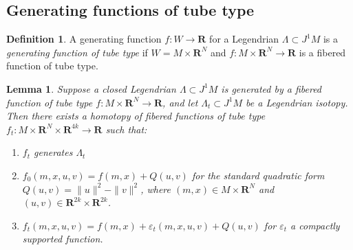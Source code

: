 \documentclass{amsart}
\newcommand{\ve}{\varepsilon}
\def\bC{\mathbf{C}}
\def\bR{\mathbf{R}}
\newtheorem{lemma}[theorem]{Lemma}
\newtheorem{proposition}[theorem]{Proposition}
\theoremstyle{definition}
\newtheorem{definition}[theorem]{Definition}
\theoremstyle{remark}
\newtheorem{inductive lemma}[theorem]{Inductive Lemma}
\newtheorem{remark}[theorem]{Remark}
\begin{document}



\subsection{Generating functions of tube type}


\begin{definition}
A generating function $f:W \to \bR$ for a Legendrian $\Lambda \subset J^1M$ is a {\em{generating function of tube type}} if $W=M \times \bR^N$ and $f:M \times \bR^N \to \bR$ is a fibered function of tube type. 
\end{definition}

\begin{lemma}\label{lem: homotopy lifting}
Suppose a closed Legendrian $\Lambda \subset J^1M$ is generated by a fibered function of tube type $f:M \times \bR^N \to \bR$, and let $\Lambda_t \subset J^1M$ be a Legendrian isotopy. Then there exists a homotopy of fibered functions of tube type $f_t:M \times \bR^{N} \times \bR^{4k} \to \bR$ such that:
\begin{enumerate}
\item $f_t$ generates $\Lambda_t$
\item $f_0(m,x,u,v)=f(m,x)+Q(u,v)$ for the standard quadratic form $Q(u,v)=\|u\|^2-\|v\|^2$, where $(m,x) \in M \times \bR^N$ and $(u,v) \in \bR^{2k} \times \bR^{2k}$.
\item $f_t(m,x,u,v)=f(m,x)+\ve_t(m,x,u,v) + Q(u,v)$ for $\ve_t$ a compactly supported function. 
\end{enumerate}
\end{lemma}
\end{document}
